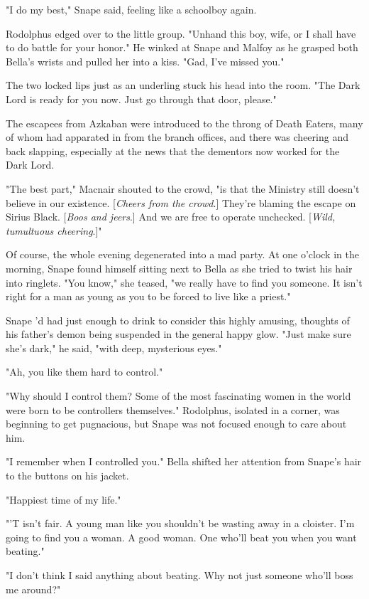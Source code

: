 \documentclass[a4paper,11pt]{article}
\begin{document}
"I do my best," Snape said, feeling like a schoolboy again.

Rodolphus edged over to the little group. "Unhand this boy, wife, or I shall have to do battle for your honor." He winked at Snape and Malfoy as he grasped both Bella's wrists and pulled her into a kiss. "Gad, I've missed you."

The two locked lips just as an underling stuck his head into the room. "The Dark Lord is ready for you now. Just go through that door, please."

The escapees from Azkaban were introduced to the throng of Death Eaters, many of whom had apparated in from the branch offices, and there was cheering and back slapping, especially at the news that the dementors now worked for the Dark Lord.

"The best part," Macnair shouted to the crowd, "is that the Ministry still doesn't believe in our existence. [\emph{Cheers from the crowd}.] They're blaming the escape on Sirius Black. [\emph{Boos and jeers}.] And we are free to operate unchecked. [\emph{Wild, tumultuous cheering}.]"

Of course, the whole evening degenerated into a mad party. At one o'clock in the morning, Snape found himself sitting next to Bella as she tried to twist his hair into ringlets. "You know," she teased, "we really have to find you someone. It isn't right for a man as young as you to be forced to live like a priest."

Snape 'd had just enough to drink to consider this highly amusing, thoughts of his father's demon being suspended in the general happy glow. "Just make sure she's dark," he said, "with deep, mysterious eyes."

"Ah, you like them hard to control."

"Why should I control them? Some of the most fascinating women in the world were born to be controllers themselves." Rodolphus, isolated in a corner, was beginning to get pugnacious, but Snape was not focused enough to care about him.

"I remember when I controlled you." Bella shifted her attention from Snape's hair to the buttons on his jacket.

"Happiest time of my life."

"'T isn't fair. A young man like you shouldn't be wasting away in a cloister. I'm going to find you a woman. A good woman. One who'll beat you when you want beating."

"I don't think I said anything about beating. Why not just someone who'll boss me around?"
\end{document}
